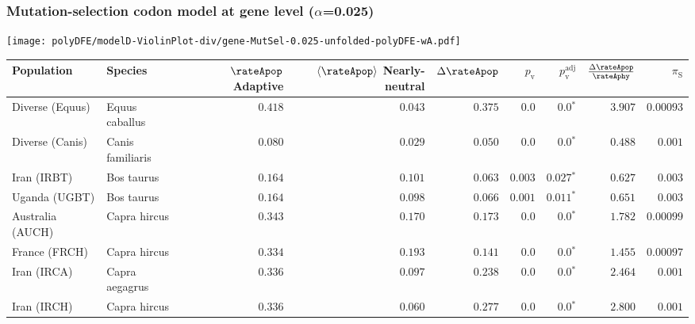 \subsubsection*{Mutation-selection codon model at gene level ($\alpha$=0.025)}
\begin{center}
    \texttt{[image: polyDFE/modelD-ViolinPlot-div/gene-MutSel-0.025-unfolded-polyDFE-wA.pdf]}
    \begin{adjustbox}{width = 1\textwidth}
        \begin{tabular}{|l|l|r|r|r|r|r|r|r|}
            \toprule
            Population & Species & \specialcell{$\rateApop$ \\ Adaptive}                & \specialcell{$\left< \rateApop \right>$ \\ Nearly-neutral}                & $\Delta \rateApop $    & $p_{\mathrm{v}}$ & $p_{\mathrm{v}}^{\mathrm{adj}}$ & $\frac{\Delta\rateApop}{\rateAphy}$ & $\pi_{\textrm{S}}$    \\
            \midrule
            Diverse (Equus)                    & Equus caballus          & $ 0.418$ & $ 0.043$ & $ 0.375$ & $0.0$ & $\bm{0.0{^*}}$ & $ 3.907$ & $0.00093$ \\
            Diverse (Canis)                  & Canis familiaris          & $ 0.080$ & $ 0.029$ & $ 0.050$ & $0.0$ & $\bm{0.0{^*}}$ & $ 0.488$ & $ 0.001$ \\
            Iran (IRBT)               & Bos taurus        & $ 0.164$ & $ 0.101$ & $ 0.063$ & $ 0.003$    & $\bm{ 0.027{^*}}$    & $ 0.627$ & $ 0.003$ \\
            Uganda (UGBT)                  & Bos taurus        & $ 0.164$ & $ 0.098$ & $ 0.066$ & $ 0.001$    & $\bm{ 0.011{^*}}$    & $ 0.651$ & $ 0.003$ \\
            Australia (AUCH)                    & Capra hircus      & $ 0.343$ & $ 0.170$ & $ 0.173$ & $0.0$    & $\bm{0.0{^*}}$    & $ 1.782$ & $0.00099$ \\
            France (FRCH)                    & Capra hircus        & $ 0.334$ & $ 0.193$ & $ 0.141$ & $0.0$    & $\bm{0.0{^*}}$    & $ 1.455$ & $0.00097$ \\
            Iran (IRCA)                   & Capra aegagrus        & $ 0.336$ & $ 0.097$ & $ 0.238$ & $0.0$    & $\bm{0.0{^*}}$    & $ 2.464$ & $ 0.001$ \\
            Iran (IRCH)                 & Capra hircus        & $ 0.336$ & $ 0.060$ & $ 0.277$ & $0.0$    & $\bm{0.0{^*}}$    & $ 2.800$ & $ 0.001$ \\

\end{tabular}
\end{adjustbox}
\end{center}
